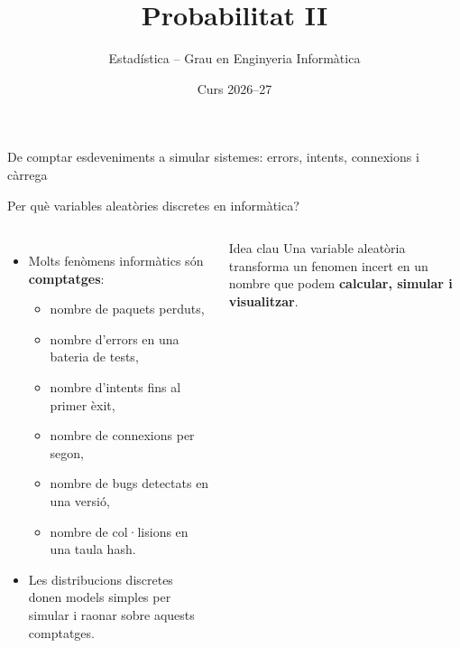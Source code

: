 \documentclass[10pt,aspectratio=169]{beamer}
\title[Variables aleatòries discretes]{Probabilitat II}
\author{Estadística -- Grau en Enginyeria Informàtica}
\date{Curs 2026--27}
\newcommand{\important}[1]{\textcolor{UABGreen}{\textbf{#1}}}
\begin{document}
\begin{frame}[plain]
  \titlepage
  \vspace{-0.45cm}
  \begin{center}
  \small
  \textcolor{DeepBlue}{De comptar esdeveniments a simular sistemes: errors, intents, connexions i càrrega}
  \end{center}
\end{frame}

\begin{frame}{Per què variables aleatòries discretes en informàtica?}
\begin{columns}[T]
\begin{itemize}
  \item Molts fenòmens informàtics són \important{comptatges}:
  \begin{itemize}
    \item nombre de paquets perduts,
    \item nombre d'errors en una bateria de tests,
    \item nombre d'intents fins al primer èxit,
    \item nombre de connexions per segon,
    \item nombre de bugs detectats en una versió,
    \item nombre de col·lisions en una taula hash.
  \end{itemize}
  \item Les distribucions discretes donen models simples per simular i raonar sobre aquests comptatges.
\end{itemize}
\begin{block}{Idea clau}
Una variable aleatòria transforma un fenomen incert en un nombre que podem \important{calcular, simular i visualitzar}.
\end{block}
\vspace{0.2cm}
\end{columns}
\end{frame}
\end{document}
